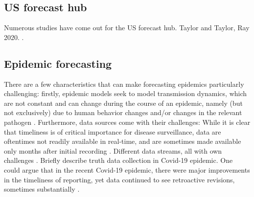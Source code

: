 \subsection{US forecast hub}
Numerous studies have come out for the US forecast hub. Taylor and Taylor, Ray 2020. \cite{ray_ensemble_2020}.
\subsection{Epidemic forecasting}
There are a few characteristics that can make forecasting epidemics particularly challenging: firstly, epidemic models seek to model transmission dynamics, which are not constant and can change during the course of an epidemic, namely (but not exclusively) due to human behavior changes and/or changes in the relevant pathogen \citep{moran_epidemic_2016}. Furthermore, data sources come with their challenges: While it is clear that timeliness is of critical importance for disease surveillance, data are oftentimes not readily available in real-time, and are sometimes made available only months after initial recording \cite{jajosky_evaluation_2004} . Different data streams, all with own challenges \cite{moran_epidemic_2016}. Briefly describe truth data collection in Covid-19 epidemic. One could argue that in the recent Covid-19 epidemic, there were major improvements in the timeliness of reporting, yet data continued to see retroactive revisions, sometimes substantially . 
